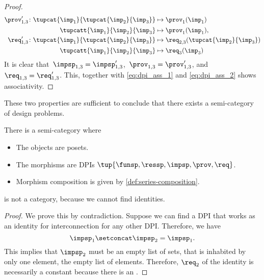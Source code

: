 \begin{proof}
\begin{equation}
\begin{aligned}
    \prov'_{1,3} \colon  \tupcat {\imp_{1}}{\tupcat {\imp_{2}} {\imp_{3}}}   &\mapsto\prov_{1}(\imp_{1})\\
    \tupcatt{\imp_{1}}{\imp_{2}}{\imp_{3}} &\mapsto\prov_{1}(\imp_{1}),\\
    \req'_{1,3} \colon  \tupcat {\imp_{1}}{\tupcat {\imp_{2}} {\imp_{3}}} &\mapsto\req_{2,3}(\tupcat {\imp_{2}} {\imp_{3}})\\
    \tupcatt{\imp_{1}}{\imp_{2}}{\imp_{3}}&\mapsto \req_{3}(\imp_{3})
  \end{aligned}
  \end{equation}
It is clear that~$\impsp_{1,3}=\impsp'_{1,3}$,~$\prov_{1,3}=\prov'_{1,3}$, and~$\req_{1,3}=\req'_{1,3}$.
  This, together with \cref{eq:dpi_ass_1} and \cref{eq:dpi_ass_2} shows associativity.
\end{proof}

These two properties are sufficient to conclude that there exists a semi-category of design problems.

\begin{definition}
  \label{def:DPIcat}
  There is a semi-category \DPI where
  \begin{itemize}
    \item The objects are posets.
    \item The morphisms are DPIs $\tup{\funsp,\ressp,\impsp,\prov,\req}$.
    \item Morphism composition is given by \cref{def:series-composition}.
  \end{itemize}
\end{definition}

\begin{lemma}
\DPI is not a category, because we cannot find identities.
\end{lemma}
\begin{proof}
We prove this by contradiction. Suppose we can find a DPI that works as an identity for interconnection for any other DPI.
Therefore, we have
\begin{equation}
  \impsp_{1} \setconcat \impsp_{2} = \impsp_{1}.
\end{equation}
This implies that $\impsp_{2}$ must be an empty list of sets,  that is inhabited by only one element, the empty list of elements. Therefore, $\req_2$ of the identity is necessarily a constant because there is an .
\end{proof}


